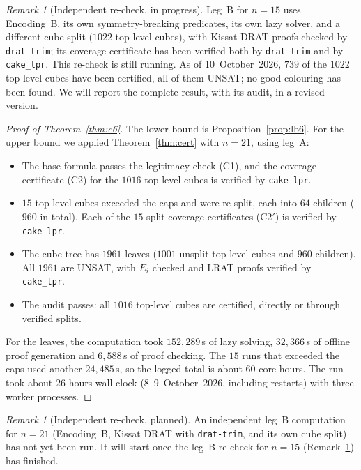\documentclass[11pt]{amsart}
\theoremstyle{definition}
\theoremstyle{remark}
\newtheorem{remark}[theorem]{Remark}
\begin{document}
\begin{remark}[Independent re-check, in progress]\label{rem:legB15}
Leg~B for $n=15$ uses Encoding~B, its own symmetry-breaking predicates, its own lazy solver, and a different cube split
($1022$ top-level cubes), with Kissat DRAT proofs checked by \texttt{drat-trim}; its coverage certificate has been verified both by
\texttt{drat-trim} and by \texttt{cake\_lpr}. This re-check is still running. As of 10~October~2026, $739$ of the $1022$ top-level
cubes have been certified, all of them UNSAT; no good colouring has been found. We will report the complete result, with its
audit, in a revised version.
\end{remark}

\begin{proof}[Proof of Theorem~\ref{thm:c6}]
The lower bound is Proposition~\ref{prop:lb6}. For the upper bound we applied Theorem~\ref{thm:cert} with $n=21$, using leg~A:
\begin{itemize}
\item The base formula passes the legitimacy check (C1), and the coverage certificate (C2) for the $1016$ top-level cubes is verified by
\texttt{cake\_lpr}.
\item $15$ top-level cubes exceeded the caps and were re-split, each into $64$ children ($960$ in total). Each of the $15$ split
coverage certificates (C2$'$) is verified by \texttt{cake\_lpr}.
\item The cube tree has $1961$ leaves ($1001$ unsplit top-level cubes and $960$ children). All $1961$ are UNSAT, with $E_i$ checked
and LRAT proofs verified by \texttt{cake\_lpr}.
\item The audit passes: all $1016$ top-level cubes are certified, directly or through verified splits.
\end{itemize}
For the leaves, the computation took $152{,}289$\,s of lazy solving, $32{,}366$\,s of offline proof generation and $6{,}588$\,s of
proof checking. The $15$ runs that exceeded the caps used another $24{,}485$\,s, so the logged total is about $60$ core-hours. The run
took about $26$ hours wall-clock (8--9~October~2026, including restarts) with three worker processes.
\end{proof}

\begin{remark}[Independent re-check, planned]\label{rem:legB21}
An independent leg~B computation for $n=21$ (Encoding~B, Kissat DRAT with \texttt{drat-trim}, and its own cube split) has not yet been run.
It will start once the leg~B re-check for $n=15$ (Remark~\ref{rem:legB15}) has finished.
\end{remark}
\end{document}
